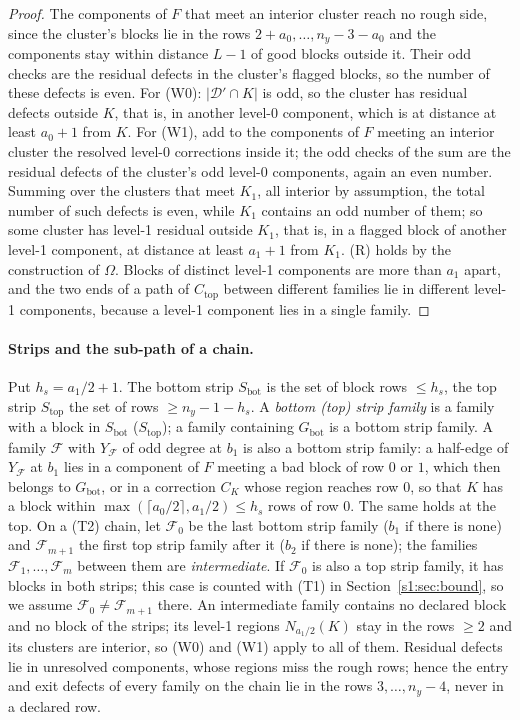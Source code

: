 \documentclass[11pt]{amsart}
\theoremstyle{definition}
\theoremstyle{remark}
\numberwithin{equation}{section}
\newcommand{\cD}{\mathcal{D}}
\newcommand{\cF}{\mathcal{F}}
\newcommand{\Ctop}{C_{\mathrm{top}}}
\newcommand{\Gbot}{G_{\mathrm{bot}}}
\newcommand{\Sbot}{S_{\mathrm{bot}}}
\newcommand{\Stop}{S_{\mathrm{top}}}
\begin{document}
\begin{proof}
The components of $F$ that meet an interior cluster reach no rough side, since the cluster's blocks lie in the rows $2+a_0,\dots,n_y-3-a_0$ and the components stay within distance $L-1$ of good blocks outside it. Their odd checks are the residual defects in the cluster's flagged blocks, so the number of these defects is even. For (W0): $|\cD'\cap K|$ is odd, so the cluster has residual defects outside $K$, that is, in another level-0 component, which is at distance at least $a_0+1$ from $K$. For (W1), add to the components of $F$ meeting an interior cluster the resolved level-0 corrections inside it; the odd checks of the sum are the residual defects of the cluster's odd level-0 components, again an even number. Summing over the clusters that meet $K_1$, all interior by assumption, the total number of such defects is even, while $K_1$ contains an odd number of them; so some cluster has level-1 residual outside $K_1$, that is, in a flagged block of another level-1 component, at distance at least $a_1+1$ from $K_1$. (R) holds by the construction of $\Omega$. Blocks of distinct level-1 components are more than $a_1$ apart, and the two ends of a path of $\Ctop$ between different families lie in different level-1 components, because a level-1 component lies in a single family.
\end{proof}

\paragraph{Strips and the sub-path of a chain.} Put $h_s=a_1/2+1$. The bottom strip $\Sbot$ is the set of block rows $\le h_s$, the top strip $\Stop$ the set of rows $\ge n_y-1-h_s$. A \emph{bottom (top) strip family} is a family with a block in $\Sbot$ ($\Stop$); a family containing $\Gbot$ is a bottom strip family. A family $\cF$ with $Y_\cF$ of odd degree at $b_1$ is also a bottom strip family: a half-edge of $Y_\cF$ at $b_1$ lies in a component of $F$ meeting a bad block of row $0$ or $1$, which then belongs to $\Gbot$, or in a correction $C_K$ whose region reaches row $0$, so that $K$ has a block within $\max(\lceil a_0/2\rceil,a_1/2)\le h_s$ rows of row $0$. The same holds at the top. On a (T2) chain, let $\cF_0$ be the last bottom strip family ($b_1$ if there is none) and $\cF_{m+1}$ the first top strip family after it ($b_2$ if there is none); the families $\cF_1,\dots,\cF_m$ between them are \emph{intermediate}. If $\cF_0$ is also a top strip family, it has blocks in both strips; this case is counted with (T1) in Section~\ref{s1:sec:bound}, so we assume $\cF_0\ne\cF_{m+1}$ there. An intermediate family contains no declared block and no block of the strips; its level-1 regions $N_{a_1/2}(K)$ stay in the rows $\ge2$ and its clusters are interior, so (W0) and (W1) apply to all of them. Residual defects lie in unresolved components, whose regions miss the rough rows; hence the entry and exit defects of every family on the chain lie in the rows $3,\dots,n_y-4$, never in a declared row.
\end{document}
